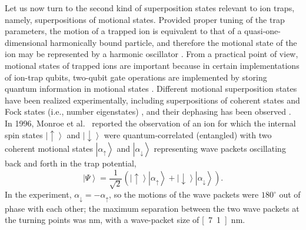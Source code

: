\documentclass[3p,sort&compress]{elsarticle}
\newcommand{\ket}[1]{\left\vert{#1}\right\rangle}
\begin{document}
Let us now turn to the second kind of superposition states relevant to ion traps, namely, superpositions of motional states. Provided proper tuning of the trap parameters, the motion of a trapped ion is equivalent to that of a quasi-one-dimensional harmonically bound particle, and therefore the motional state of the ion may be represented by a harmonic oscillator \cite{Leibfried:2003:om,Wineland:2013:pp}. From a practical point of view, motional states of trapped ions are important because in certain implementations of ion-trap qubits, two-qubit gate operations are implemented by storing quantum information in motional states \cite{Cirac:1995:tt}. Different motional superposition states have been realized experimentally, including superpositions of coherent states \cite{Monroe:1996:tv,Myatt:2000:yy,Turchette:2000:aa,Wineland:2013:pp} and Fock states (i.e., number eigenstates) \cite{Myatt:2000:yy,Turchette:2000:aa}, and their dephasing has been observed \cite{Myatt:2000:yy,Turchette:2000:aa,SchmidtKaler:2003:pp}. In 1996, Monroe et al.\ \cite{Monroe:1996:tv} reported the observation of an ion for which the internal spin states $\ket{\uparrow}$ and $\ket{\downarrow}$ were quantum-correlated (entangled) with two coherent motional states $\ket{\alpha_\uparrow}$ and $\ket{\alpha_\downarrow}$ representing wave packets oscillating back and forth in the trap potential, 
%
\begin{equation}\label{eq:lidvg2}
\ket{\Psi} = \frac{1}{\sqrt{2}} \left( \ket{\uparrow}\ket{\alpha_\uparrow} + \ket{\downarrow} \ket{\alpha_\downarrow} \right).
\end{equation}
%
In the experiment, $\alpha_\downarrow=-\alpha_\uparrow$, so the motions of the wave packets were $180^\circ$ out of phase with each other; the maximum separation between the two wave packets at the turning points was \unit[83]{nm}, with a wave-packet size of \unit[7.1]{nm}. 
\end{document}
